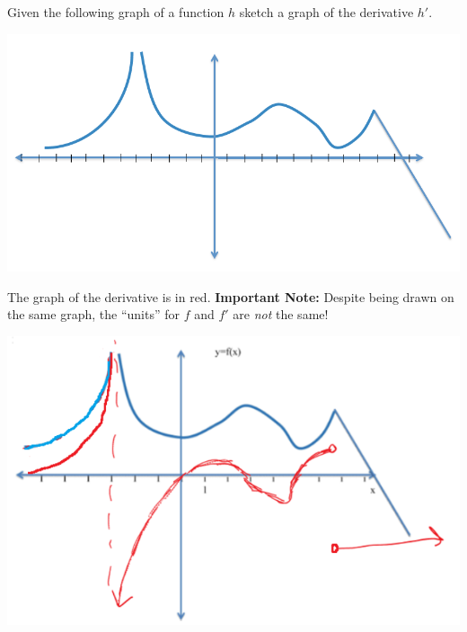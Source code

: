 \documentclass[nooutcomes,handout]{ximera}
\begin{document}
\begin{problem}

	 Given the following graph of a function $h$ sketch a graph of the derivative $h'$.
  \begin{image}
    \includegraphics[scale=.7]{Figure4.png}
  \end{image}
  \begin{freeResponse}
    The graph of the derivative is in red.
    \textbf{Important Note:} Despite being drawn on the same graph, the ``units'' for $f$ and $f'$ are \emph{not} the same!
    \begin{image}
      \includegraphics[scale = 0.7]{Figure5.png}
    \end{image}
  \end{freeResponse}
\end{problem}
\end{document}
